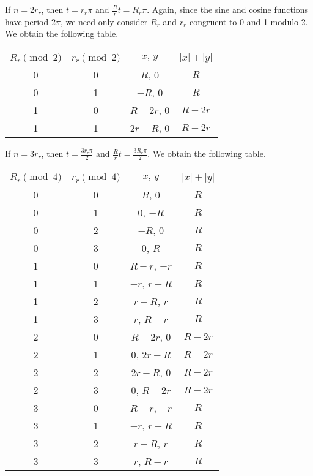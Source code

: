 \documentclass[12pt]{article}
\begin{document}
If $n = 2r_r$, then $t = r_r\pi$ and $\frac{R}{r} t = R_r\pi$. Again, since the sine and cosine functions have period $2\pi$, we need only consider $R_r$ and $r_r$ congruent to 0 and 1 modulo 2. We obtain the following table.

\begin{center}
\begin{tabular}{c|c|c|c}
  $R_r \pmod 2$ & $r_r \pmod 2$ & $x,\,y$ & $|x| + |y|$ \\ \hline
  0 & 0 & $R$, 0 & $R$ \\
  0 & 1 & $-R$, 0 & $R$ \\ \hline
  1 & 0 & $R - 2r$, 0 & $R - 2r$ \\
  1 & 1 & $2r - R$, 0 & $R - 2r$ \\
\end{tabular}
\end{center}

If $n = 3r_r$, then $t = \frac{3r_r\pi}{2}$ and $\frac{R}{r} t = \frac{3R_r\pi}{2}$. We obtain the following table.

\begin{center}
\begin{tabular}{c|c|c|c}
  $R_r \pmod 4$ & $r_r \pmod 4$ & $x,\,y$ & $|x| + |y|$ \\ \hline
  0 & 0 & $R$, 0 & $R$ \\
  0 & 1 & 0, $-R$ & $R$ \\
  0 & 2 & $-R$, 0 & $R$ \\
  0 & 3 & 0, $R$ & $R$ \\ \hline
  1 & 0 & $R - r$, $-r$ & $R$ \\
  1 & 1 & $-r$, $r - R$ & $R$ \\
  1 & 2 & $r - R$, $r$ & $R$ \\
  1 & 3 & $r$, $R - r$ & $R$ \\ \hline
  2 & 0 & $R - 2r$, 0 & $R - 2r$ \\
  2 & 1 & 0, $2r - R$ & $R - 2r$ \\
  2 & 2 & $2r - R$, 0 & $R - 2r$ \\ 
  2 & 3 & 0, $R - 2r$ & $R - 2r$ \\ \hline
  3 & 0 & $R - r$, $-r$ & $R$ \\
  3 & 1 & $-r$, $r - R$ & $R$ \\
  3 & 2 & $r - R$, $r$ & $R$ \\
  3 & 3 & $r$, $R - r$ & $R$ \\
\end{tabular}
\end{center}
\end{document}
